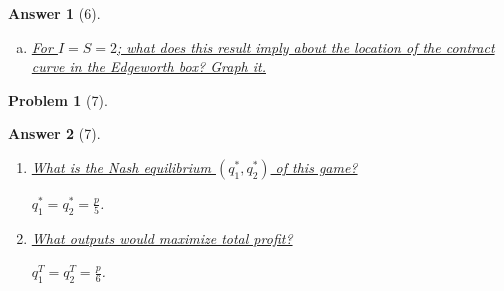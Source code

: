 \documentclass{article}
\newtheorem*{ans}{Answer}
\newtheorem*{prob}{{\bf Problem}}
\newtheorem{claim}{Claim}
\newtheorem{rem}{\bf Remark}
\newcommand{\1}{{\bf 1}}
\newcommand{\0}{{\mathbf{0}}}
\newcommand{\<}{\langle}
\renewcommand{\>}{\rangle}
\begin{document}
\begin{ans}[6]
\begin{enumerate}[(a)]

		\item \ul{For $I = S = 2$; what does this result imply about the location of the contract curve in the Edgeworth box? Graph it.}
	
	\end{enumerate}
\end{ans}


\begin{prob}[7]
\end{prob}
\begin{ans}[7]
	\begin{enumerate}
		\item  \ul{What is the Nash equilibrium $\left( q_1^* ,q_2^* \right)$ of this game?} 
		
		$q_1^* = q_2^* = \frac{p}{5}$.
		\item \ul{What outputs would maximize total profit?}
		
				$q_1^T = q_2^T = \frac{p}{6}$.
	\end{enumerate}
\end{ans}
\end{document}
